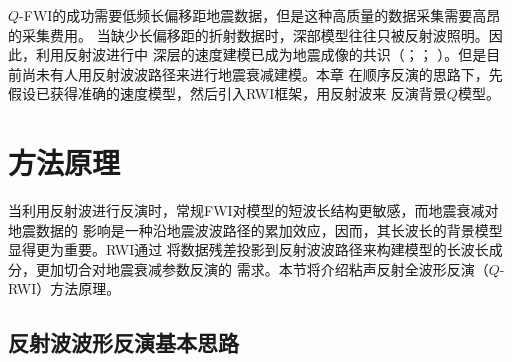 $Q$-FWI的成功需要低频长偏移距地震数据，但是这种高质量的数据采集需要高昂的采集费用。
当缺少长偏移距的折射数据时，深部模型往往只被反射波照明。因此，利用反射波进行中
深层的速度建模已成为地震成像的共识（；；
）。但是目前尚未有人用反射波波路径来进行地震衰减建模。本章
在顺序反演的思路下，先假设已获得准确的速度模型，然后引入RWI框架，用反射波来
反演背景$Q$模型。

\vspace{1.0cm}
\section{方法原理}

当利用反射波进行反演时，常规FWI对模型的短波长结构更敏感，而地震衰减对地震数据的
影响是一种沿地震波波路径的累加效应，因而，其长波长的背景模型显得更为重要。RWI通过
将数据残差投影到反射波波路径来构建模型的长波长成分，更加切合对地震衰减参数反演的
需求。本节将介绍粘声反射全波形反演（$Q$-RWI）方法原理。

\vspace{1.0cm}
\subsection{反射波波形反演基本思路}

